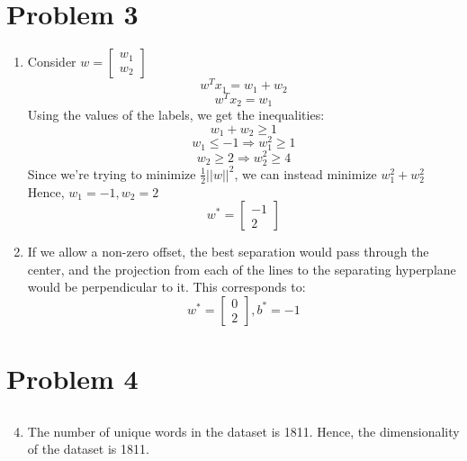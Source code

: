\documentclass[11pt]{article}
\newcommand{\solution}[1]{{{\color{blue}{\bf Solution:} {#1}}}}
\begin{document}
\section{Problem 3}
\begin{enumerate}
\item 
\solution{} \newline
Consider $w = \begin{bmatrix}
w_1 \\
w_2
\end{bmatrix}$
$$
w^T x_1 = w_1 + w_2
$$
$$
w^T x_2 = w_1
$$
Using the values of the labels, we get the inequalities:
$$
w_1 + w_2 \geq 1
$$
$$
w_1 \leq -1 \Rightarrow w_1^2 \geq 1
$$
$$
w_2 \geq 2 \Rightarrow w_2^2 \geq 4
$$
Since we're trying to minimize $\frac{1}{2} ||w||^2$, we can instead
minimize $w_1^2 + w_2^2$
Hence, $w_1 = -1, w_2 = 2$
$$
w^* = \begin{bmatrix}
-1 \\
2
\end{bmatrix}
$$
\item 
\solution{} \newline
If we allow a non-zero offset, the best separation would pass through the center,
and the projection from each of the lines to the separating hyperplane would be
perpendicular to it. This corresponds to:
$$
w^* = \begin{bmatrix}
0 \\
2
\end{bmatrix}, b^* = -1
$$
\end{enumerate}

\newpage
\section{Problem 4}
\subsection{}
\begin{enumerate}
\setcounter{enumi}{3}
\item \solution{} \newline
The number of unique words in the dataset is 1811. \newline
Hence, the dimensionality of the dataset is 1811.
\end{enumerate}
\end{document}
